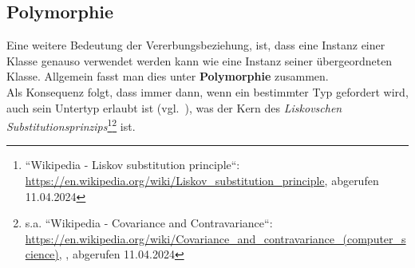 \subsection*{Polymorphie}
Eine weitere Bedeutung der Vererbungsbeziehung, ist, dass eine Instanz einer Klasse genauso verwendet werden kann wie eine Instanz seiner übergeordneten Klasse.
Allgemein fasst man dies unter \textbf{Polymorphie} zusammen.\\
Als Konsequenz folgt, dass immer dann, wenn ein bestimmter Typ gefordert wird, auch sein Untertyp erlaubt ist (vgl.~\cite[466]{Ull23}), was der Kern des \textit{Liskovschen Substitutionsprinzips}\footnote{
    ``Wikipedia - Liskov substitution principle``: \url{https://en.wikipedia.org/wiki/Liskov_substitution_principle}, abgerufen 11.04.2024
}\footnote{
    s.a. ``Wikipedia - Covariance and Contravariance``: \url{https://en.wikipedia.org/wiki/Covariance_and_contravariance_(computer_science)}, , abgerufen 11.04.2024
} ist.\\
